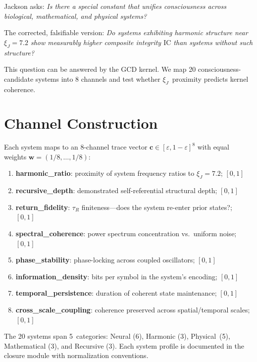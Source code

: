 \documentclass[
  aps,
  prd,
  twocolumn,
  superscriptaddress,
  nofootinbib,
  floatfix
]{revtex4-2}
\newcommand{\tR}{\tau_{\!R}}
\newcommand{\eps}{\varepsilon}
\newcommand{\tvec}{\mathbf{c}}
\newcommand{\wvec}{\mathbf{w}}
\newcommand{\IC}{\mathrm{IC}}
\newcommand{\xiJ}{\xi_J}
\begin{document}
Jackson asks: \emph{Is there a special constant that unifies consciousness
across biological, mathematical, and physical systems?}

The corrected, falsifiable version: \emph{Do systems exhibiting harmonic
structure near $\xiJ = 7.2$ show measurably higher composite integrity
$\IC$ than systems without such structure?}

This question can be answered by the GCD kernel.  We map 20
consciousness-candidate systems into 8 channels and test whether
$\xiJ$~proximity predicts kernel coherence.

\section{Channel Construction}
\label{sec:channels}

Each system maps to an 8-channel trace vector
$\tvec \in [\eps, 1-\eps]^8$ with equal weights
$\wvec = (1/8, \ldots, 1/8)$:

\begin{enumerate}
  \item \textbf{harmonic\_ratio}: proximity of system frequency ratios
        to $\xiJ = 7.2$; $[0, 1]$
  \item \textbf{recursive\_depth}: demonstrated self-referential
        structural depth; $[0, 1]$
  \item \textbf{return\_fidelity}: $\tR$ finiteness---does the system
        re-enter prior states?; $[0, 1]$
  \item \textbf{spectral\_coherence}: power spectrum concentration
        vs.\ uniform noise; $[0, 1]$
  \item \textbf{phase\_stability}: phase-locking across coupled
        oscillators; $[0, 1]$
  \item \textbf{information\_density}: bits per symbol in the system's
        encoding; $[0, 1]$
  \item \textbf{temporal\_persistence}: duration of coherent state
        maintenance; $[0, 1]$
  \item \textbf{cross\_scale\_coupling}: coherence preserved across
        spatial/temporal scales; $[0, 1]$
\end{enumerate}

The 20 systems span 5~categories: Neural (6), Harmonic (3), Physical~(5),
Mathematical (3), and Recursive (3).  Each system profile is documented
in the closure module with normalization conventions.
\end{document}
